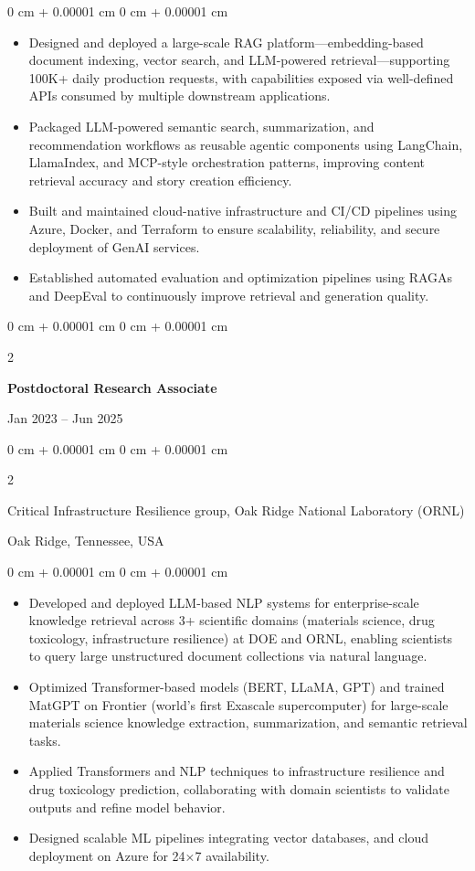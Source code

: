 \documentclass[10pt, letterpaper]{article}
\newenvironment{highlights}{
    \begin{itemize}[
        topsep=0.10 cm,
        parsep=0.10 cm,
        partopsep=0pt,
        itemsep=0pt,
        leftmargin=0 cm + 10pt
    ]
}{
    \end{itemize}
} %
\newenvironment{onecolentry}{
    \begin{adjustwidth}{
        0 cm + 0.00001 cm
    }{
        0 cm + 0.00001 cm
    }
}{
    \end{adjustwidth}
} %
\newenvironment{twocolentry}[2][]{
    \onecolentry
    \def\secondColumn{#2}
    \setcolumnwidth{\fill, 4.5 cm}
    \begin{paracol}{2}
}{
    \switchcolumn \raggedleft \secondColumn
    \end{paracol}
    \endonecolentry
} %
\begin{document}
    \begin{onecolentry}
        \begin{highlights}
            \item Designed and deployed a large-scale RAG platform—embedding-based document indexing, vector search, and LLM-powered retrieval—supporting 100K+ daily production requests, with capabilities exposed via well-defined APIs consumed by multiple downstream applications.
            \item Packaged LLM-powered semantic search, summarization, and recommendation workflows as reusable agentic components using LangChain, LlamaIndex, and MCP-style orchestration patterns, improving content retrieval accuracy and story creation efficiency.
            \item Built and maintained cloud-native infrastructure and CI/CD pipelines using Azure, Docker, and Terraform to ensure scalability, reliability, and secure deployment of GenAI services.
            \item Established automated evaluation and optimization pipelines using RAGAs and DeepEval to continuously improve retrieval and generation quality.
        \end{highlights}
    \end{onecolentry}

\vspace{1mm}
    
    \begin{twocolentry}{Jan 2023 -- Jun 2025}
        \textbf{Postdoctoral Research Associate}
    \end{twocolentry}
    \begin{twocolentry}{Oak Ridge, Tennessee, USA}
        Critical Infrastructure Resilience group, Oak Ridge National Laboratory (ORNL)
    \end{twocolentry}
    \vspace{0.10 cm}
    \begin{onecolentry}
        \begin{highlights}
            \item Developed and deployed LLM-based NLP systems for enterprise-scale knowledge retrieval across 3+ scientific domains (materials science, drug toxicology, infrastructure resilience) at DOE and ORNL, enabling scientists to query large unstructured document collections via natural language.
            \item Optimized Transformer-based models (BERT, LLaMA, GPT) and trained MatGPT on Frontier (world’s first Exascale supercomputer) for large-scale materials science knowledge extraction, summarization, and semantic retrieval tasks.
            \item Applied Transformers and NLP techniques to infrastructure resilience and drug toxicology prediction, collaborating with domain scientists to validate outputs and refine model behavior.
            \item Designed scalable ML pipelines integrating vector databases, and cloud deployment on Azure for 24×7 availability.
        \end{highlights}
    \end{onecolentry}
\end{document}
